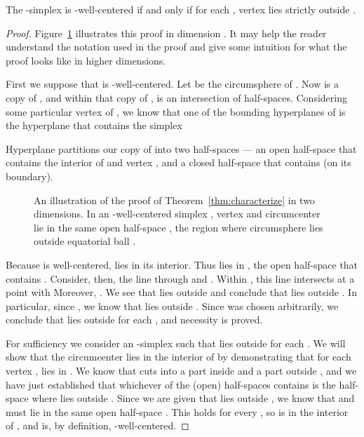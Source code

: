\documentclass[final]{siamltex}
\begin{document}
\begin{theorem}
\label{thm:characterize}
The -simplex  is
-well-centered if and only if for each , vertex
 lies strictly outside .
\end{theorem}
\begin{proof}
Figure~\ref{fig:eqballsproof} illustrates this proof in dimension
  .  It may help the reader understand the notation used in
  the proof and give some intuition for what the proof looks like in
  higher dimensions.

  First we suppose that  is -well-centered.  Let
   be the circumsphere of .
  Now  is a copy of , and within that
  copy of ,  is an intersection of half-spaces.
  Considering some particular vertex  of , we know
  that one
of the bounding hyperplanes of  is the hyperplane
   that contains the simplex 


  Hyperplane  partitions our copy of  into two
  half-spaces --- an open half-space  that contains the
  interior of  and vertex , and a closed half-space
  that contains  (on its boundary).

  \begin{figure}
    \centering
{}
    \caption{An illustration of the proof of
      Theorem~\ref{thm:characterize} in two dimensions.  In an
      -well-centered simplex , vertex  and
      circumcenter  lie in the same open half-space
      , the region where circumsphere  lies
      outside equatorial ball .}
    \label{fig:eqballsproof}
  \end{figure}

  Because  is well-centered,  lies in its
  interior.  Thus  lies in , the open
  half-space that contains .  Consider, then, the line through
   and .
Within , this line intersects  at a point
   with 
  Moreover, .  We see that  lies outside
   and conclude that  lies outside
  .  In particular, since , we know that  lies outside .  Since
   was chosen arbitrarily, we conclude that  lies
  outside  for each , and necessity is
  proved.

  For sufficiency we consider an -simplex  such that
   lies outside  for each .  We will
  show that the circumcenter  lies in the interior of
   by demonstrating that for each vertex ,
   lies in .  We know that 
  cuts  into a part inside  and a part outside
  , and we have just established that whichever of the
  (open) half-spaces contains  is the half-space where
   lies outside .  Since we are given that  lies outside , we know that  and
   must lie in the same open half-space .
  This holds for every , so  is in the interior
  of , and  is, by definition,
  -well-centered.
\end{proof}
\end{document}
